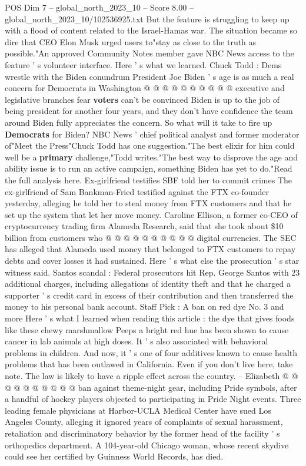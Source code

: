 \begin{textsample}{POS Dim 7 – global\_north\_2023\_10 – Score 8.00 – global\_north\_2023\_10/102536925.txt}
But the feature is struggling to keep up with a flood of content related to the Israel-Hamas war.
The situation became so dire that CEO Elon Musk urged users to"stay as close to the truth as possible."An approved Community Notes member gave NBC News access to the feature ' s volunteer interface.
Here ' s what we learned.
Chuck Todd : Dems wrestle with the Biden conundrum President Joe Biden ' s age is as much a real concern for Democrats in Washington @ @ @ @ @ @ @ @ @ @ executive and legislative branches fear \textbf{voters} can't be convinced Biden is up to the job of being president for another four years, and they don't have confidence the team around Biden fully appreciates the concern.
So what will it take to fire up \textbf{Democrats} for Biden?
NBC News ' chief political analyst and former moderator of"Meet the Press"Chuck Todd has one suggestion."The best elixir for him could well be a \textbf{primary} challenge,"Todd writes."The best way to disprove the age and ability issue is to run an active campaign, something Biden has yet to do."Read the full analysis here.
Ex-girlfriend testifies SBF told her to commit crimes The ex-girlfriend of Sam Bankman-Fried testified against the FTX co-founder yesterday, alleging he told her to steal money from FTX customers and that he set up the system that let her move money.
Caroline Ellison, a former co-CEO of cryptocurrency trading firm Alameda Research, said that she took about \$10 billion from customers who @ @ @ @ @ @ @ @ @ @ digital currencies.
The SEC has alleged that Alameda used money that belonged to FTX customers to repay debts and cover losses it had sustained.
Here ' s what else the prosecution ' s star witness said.
Santos scandal : Federal prosecutors hit Rep.
George Santos with 23 additional charges, including allegations of identity theft and that he charged a supporter ' s credit card in excess of their contribution and then transferred the money to his personal bank account.
Staff Pick : A ban on red dye No. 3 and more Here ' s what I learned when reading this article : the dye that gives foods like these chewy marshmallow Peeps a bright red hue has been shown to cause cancer in lab animals at high doses.
It ' s also associated with behavioral problems in children.
And now, it ' s one of four additives known to cause health problems that has been outlawed in California.
Even if you don't live here, take note.
The law is likely to have a ripple effect across the country. -- Elizabeth @ @ @ @ @ @ @ @ @ @ ban against theme-night gear, including Pride symbols, after a handful of hockey players objected to participating in Pride Night events.
Three leading female physicians at Harbor-UCLA Medical Center have sued Los Angeles County, alleging it ignored years of complaints of sexual harassment, retaliation and discriminatory behavior by the former head of the facility ' s orthopedics department.
A 104-year-old Chicago woman, whose recent skydive could see her certified by Guinness World Records, has died.

\end{textsample}
